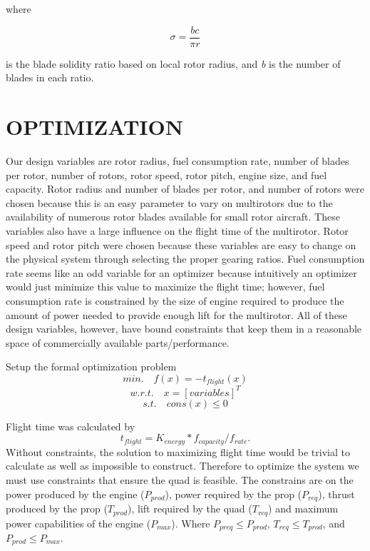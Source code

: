 \documentclass[letterpaper, 10 pt, conference]{ieeeconf}  %
\newcommand{\of}[1]{\ensuremath{\left(#1\right)}}
\begin{document}
where 

$$\sigma = \frac{bc}{\pi r}$$

is the blade solidity ratio based on local rotor radius, and \textit{b} is the number of blades in each ratio. 


\section{OPTIMIZATION}

Our design variables are rotor radius, fuel consumption rate, number of blades per rotor, number of rotors, rotor speed, rotor pitch, engine size, and fuel capacity. Rotor radius and number of blades per rotor, and number of rotors were chosen because this is an easy parameter to vary on multirotors due to the availability of numerous rotor blades available for small rotor aircraft. These variables also have a large influence on the flight time of the multirotor. Rotor speed and rotor pitch were chosen because these variables are easy to change on the physical system through selecting the proper gearing ratios. Fuel consumption rate seems like an odd variable for an optimizer because intuitively an optimizer would just minimize this value to maximize the flight time; however, fuel consumption rate is constrained by the size of engine required to produce the amount of power needed to provide enough lift for the multirotor. All of these design variables, however, have bound constraints that keep them in a reasonable space of commercially available parts/performance.

Setup the formal optimization problem
\begin{equation}
min. \quad f\of{x} = -t_{flight}\of{x}
\label{eq:objective}
\end{equation}
\begin{equation}
w.r.t. \quad x = [variables]^T
\label{eq:vars}
\end{equation}
\begin{equation}
s.t. \quad cons\of{x} \leq 0 
\label{eq:constrants}
\end{equation}

Flight time was calculated by 
\begin{equation}
	t_{flight} = K_{energy}*f_{capacity}/f_{rate}.
\end{equation}
Without constraints, the solution to maximizing flight time would be trivial to calculate as well as impossible to construct. Therefore to optimize the system we must use constraints that ensure the quad is feasible. The constrains are on the power produced by the engine ($P_{prod}$), power required by the prop ($P_{req}$), thrust produced by the prop ($T_{prod}$), lift required by the quad ($T_{req}$) and maximum power capabilities of the engine ($P_{max}$). Where $P_{preq} \leq P_{prod}$, $T_{req} \leq T_{prod}$, and $P_{prod} \leq P_{max}$.
\end{document}
